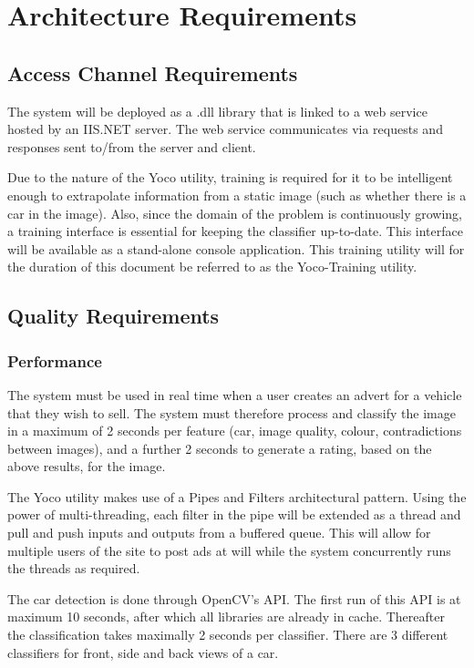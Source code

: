 \section{Architecture Requirements}
\subsection{Access Channel Requirements}
 
The system will be deployed as a .dll library that is linked to a web service hosted by an IIS.NET server. The web service communicates via requests and responses sent to/from the server and client.

Due to the nature of the Yoco utility, training is required for it to be intelligent enough to extrapolate information from a static image (such as whether there is a car in the image). Also, since the domain of the problem is continuously growing, a training interface is essential for keeping the classifier up-to-date. This interface will be available as a stand-alone console application. This training utility will for the duration of this document be referred to as the Yoco-Training utility.


\subsection{Quality Requirements}

\subsubsection{Performance}
The system must be used in real time when a user creates an advert for a vehicle that they wish to sell. The system must therefore process and classify the image in a maximum of 2 seconds per feature (car, image quality, colour, contradictions between images), and a further 2 seconds to generate a rating, based on the above results, for the image.

The Yoco utility makes use of a Pipes and Filters architectural pattern. Using the power of multi-threading, each filter in the pipe will be extended as a thread and pull and push inputs and outputs from a buffered queue. This will allow for multiple users of the site to post ads at will while the system concurrently runs the threads as required.

The car detection is done through OpenCV's API. The first run of this API is at maximum 10 seconds, after which all libraries are already in cache. Thereafter the classification takes maximally 2 seconds per classifier. There are 3 different classifiers for front, side and back views of a car.

